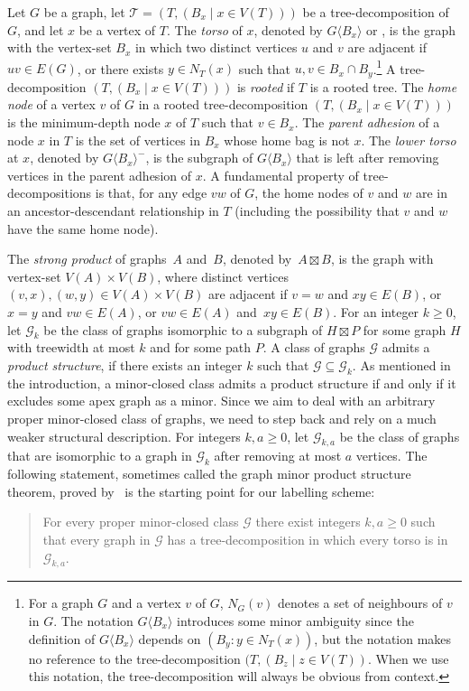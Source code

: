 \documentclass{patmorin}
\renewcommand{\geq}{\geqslant}
\newcommand{\defin}[1]{\emph{\textcolor{brightmaroon}{#1}}}
\newcommand{\torso}[2]{{#1}\langle{#2}\rangle}
\newcommand{\calG}{\mathcal{G}}
\newcommand{\calT}{\mathcal{T}}
\begin{document}
Let $G$ be a graph,
let $\calT=(T,(B_x \mid x\in V(T)))$ be a tree-decomposition of $G$, and let $x$ be a vertex of $T$.
The \defin{torso} of $x$, denoted by \defin{$\torso{G}{B_x}$} or ,
 is the graph with the vertex-set $B_x$ in which two distinct vertices $u$ and $v$ are adjacent
  if $uv \in E(G)$, or there exists $y \in N_T(x)$  such that $u,v \in B_x \cap B_y$.\footnote{For a graph $G$ and a vertex $v$ of $G$, $N_G(v)$ denotes a set of neighbours of $v$ in $G$. The notation $\torso{G}{B_x}$ introduces some minor ambiguity since the definition of $\torso{G}{B_x}$ depends on $(B_y:y\in N_T(x))$, but the notation makes no reference to the tree-decomposition $(T, (B_z\mid z\in V(T))$.  When we use this notation, the tree-decomposition will always be obvious from context.}
  A tree-decomposition $(T,(B_x \mid x\in V(T)))$ is \defin{rooted} if $T$ is a rooted tree.  The \defin{home node} of a vertex $v$ of $G$ in a rooted tree-decomposition $(T,(B_x \mid x\in V(T)))$ is the minimum-depth node $x$ of $T$ such that $v\in B_x$.  The \defin{parent adhesion} of a node $x$ in $T$ is the set of vertices in $B_x$ whose home bag is not $x$.  The \defin{lower torso} at $x$, denoted by \defin{$\torso{G}{B_x}^-$}, is the subgraph of $\torso{G}{B_x}$ that is left after removing vertices in the parent adhesion of $x$. A fundamental property of tree-decompositions is that, for any edge $vw$ of $G$, the home nodes of $v$ and $w$ are in an ancestor-descendant relationship in $T$ (including the possibility that $v$ and $w$ have the same home node).


The \defin{strong product} of graphs~$A$ and~$B$, denoted by~${A \boxtimes B}$, is the graph with vertex-set ${V(A) \times V(B)}$, where distinct vertices ${(v,x),(w,y) \in V(A) \times V(B)}$ are adjacent if
  ${v=w}$ and ${xy \in E(B)}$, or
  ${x=y}$ and ${vw \in E(A)}$, or
  ${vw \in E(A)}$ and~${xy \in E(B)}$.
For an integer $k\geq 0$, let \defin{$\calG_{k}$} be the class of graphs isomorphic to a subgraph of $H\boxtimes P$ for some graph $H$ with treewidth at most $k$ and for some path $P$.
A class of graphs $\calG$ admits a \defin{product structure},
if there exists an integer $k$ such that $\calG\subseteq \calG_k$. As mentioned in the introduction, a minor-closed class admits a product structure if and only if it excludes some apex graph as a minor.
Since we aim to deal with an arbitrary proper minor-closed class of graphs, we need to step back and rely on a much weaker structural description.
For integers $k,a\geq 0$, let \defin{$\calG_{k,a}$} be the class of graphs that are isomorphic to a graph in $\calG_k$ after removing at most $a$ vertices.
The following statement, sometimes called the graph minor product structure theorem,  proved by~\citet{dujmovic.joret.ea:planar} is the starting point for our labelling scheme:
\begin{quote}
  For every proper minor-closed class $\calG$ there exist integers $k,a\geq 0$ such that every graph in $\calG$ has a tree-decomposition in which every torso is in $\calG_{k,a}$.
\end{quote}
\end{document}
